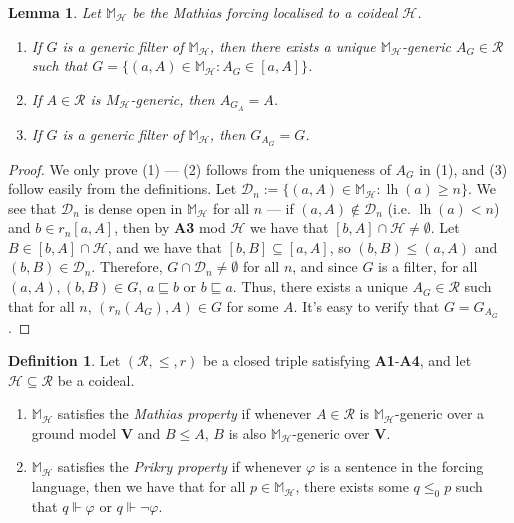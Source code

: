 \documentclass[10pt,a4paper]{amsart}
\theoremstyle{plain}
\numberwithin{equation}{section}
\newtheorem{lemma}[theorem]{Lemma}
\theoremstyle{definition}
\newtheorem{definition}[theorem]{Definition}
\newcommand{\func}{\operatorname}
\newcommand{\cal}{\mathcal}
\renewcommand{\bf}{\mathbf}
\newcommand{\forces}{\Vdash}
\newcommand{\V}{\bf{V}}
\renewcommand{\H}{\cal{H}}
\newcommand{\lh}{\func{lh}}
\newcommand{\D}{\cal{D}}
\begin{document}
\begin{lemma}
    Let $\mathbb{M}_\H$ be the Mathias forcing localised to a coideal $\H$.
    \begin{enumerate}
        \item If $G$ is a generic filter of $\mathbb{M}_\H$, then there exists a unique $\mathbb{M}_\H$-generic $A_G \in \cal{R}$ such that $G = \{(a,A) \in \mathbb{M}_\H : A_G \in [a,A]\}$. 
        
        \item If $A \in \cal{R}$ is $M_\H$-generic, then $A_{G_A} = A$.
        
        \item If $G$ is a generic filter of $\mathbb{M}_\H$, then $G_{A_G} = G$.
    \end{enumerate}
\end{lemma}

\begin{proof}
    We only prove (1) --- (2) follows from the uniqueness of $A_G$ in (1), and (3) follow easily from the definitions. Let $\D_n := \{(a,A) \in \mathbb{M}_\H : \lh(a) \geq n\}$. We see that $\D_n$ is dense open in $\mathbb{M}_\H$ for all $n$ --- if $(a,A) \notin \D_n$ (i.e. $\lh(a) < n$) and $b \in r_n[a,A]$, then by \textbf{A3} mod $\H$ we have that $[b,A] \cap \H \neq \emptyset$. Let $B \in [b,A] \cap \H$, and we have that $[b,B] \subseteq [a,A]$, so $(b,B) \leq (a,A)$ and $(b,B) \in \D_n$. Therefore, $G \cap \D_n \neq \emptyset$ for all $n$, and since $G$ is a filter, for all $(a,A),(b,B) \in G$, $a \sqsubseteq b$ or $b \sqsubseteq a$. Thus, there exists a unique $A_G \in \cal{R}$ such that for all $n$, $(r_n(A_G),A) \in G$ for some $A$. It's easy to verify that $G = G_{A_G}$.
\end{proof} 

\begin{definition}
    Let $(\cal{R},\leq,r)$ be a closed triple satisfying \textbf{A1}-\textbf{A4}, and let $\H \subseteq \cal{R}$ be a coideal.
    \begin{enumerate}
        \item $\mathbb{M}_\H$ satisfies the \emph{Mathias property} if whenever $A \in \cal{R}$ is $\mathbb{M}_\H$-generic over a ground model $\V$ and $B \leq A$, $B$ is also $\mathbb{M}_\H$-generic over $\V$.
        
        \item $\mathbb{M}_\H$ satisfies the \emph{Prikry property} if whenever $\varphi$ is a sentence in the forcing language, then we have that for all $p \in \mathbb{M}_\H$, there exists some $q \leq_0 p$ such that $q \forces \varphi$ or $q \forces \neg\varphi$.
    \end{enumerate}
\end{definition}
\end{document}

